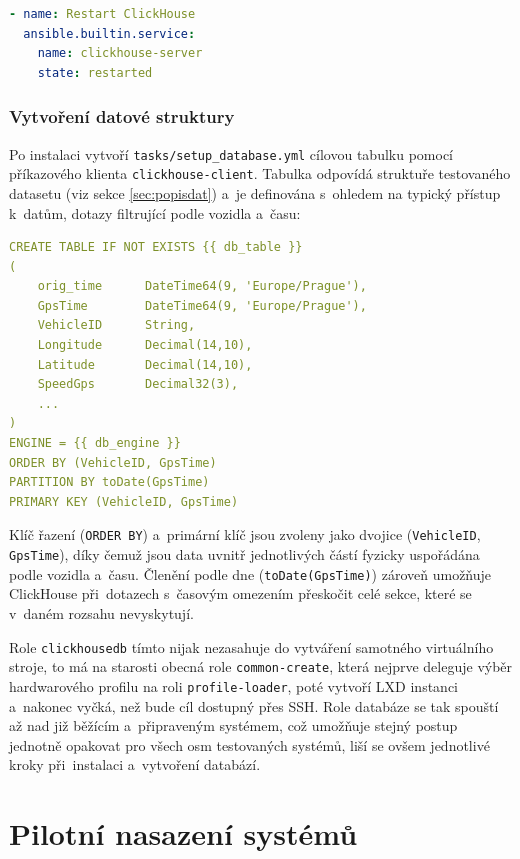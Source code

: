 \begin{lstlisting}[language=YAML, caption={roles/clickhousedb/handlers/main.yml}, label={lst:chhandlers}, captionpos=b]
- name: Restart ClickHouse
  ansible.builtin.service:
    name: clickhouse-server
    state: restarted
\end{lstlisting}

\subsubsection{Vytvoření datové struktury}
Po instalaci vytvoří \texttt{tasks/setup\_database.yml} cílovou tabulku pomocí příkazového klienta \texttt{clickhouse-client}. 
Tabulka odpovídá struktuře testovaného datasetu (viz sekce \ref{sec:popisdat}) a~je definována s~ohledem na typický přístup k~datům, dotazy filtrující podle vozidla a~času:

\begin{lstlisting}[language=YAML, caption={Výřez z~roles/clickhousedb/tasks/setup\_database.yml}, label={lst:chschema}, captionpos=b]
CREATE TABLE IF NOT EXISTS {{ db_table }}
(
    orig_time      DateTime64(9, 'Europe/Prague'),
    GpsTime        DateTime64(9, 'Europe/Prague'),
    VehicleID      String,
    Longitude      Decimal(14,10),
    Latitude       Decimal(14,10),
    SpeedGps       Decimal32(3),
    ...
)
ENGINE = {{ db_engine }}
ORDER BY (VehicleID, GpsTime)
PARTITION BY toDate(GpsTime)
PRIMARY KEY (VehicleID, GpsTime)
\end{lstlisting}

Klíč řazení (\texttt{ORDER BY}) a~primární klíč jsou zvoleny jako dvojice (\texttt{VehicleID}, \texttt{GpsTime}), díky čemuž jsou data uvnitř jednotlivých částí fyzicky uspořádána podle vozidla a~času.
Členění podle dne (\texttt{toDate(GpsTime)}) zároveň umožňuje ClickHouse při~dotazech s~časovým omezením přeskočit celé sekce, které se v~daném rozsahu nevyskytují.

Role \texttt{clickhousedb} tímto nijak nezasahuje do vytváření samotného virtuálního stroje, to má na starosti obecná role \texttt{common-create}, která nejprve deleguje výběr hardwarového profilu na roli \texttt{profile-loader}, poté vytvoří LXD instanci a~nakonec vyčká, než bude cíl dostupný přes SSH. 
Role databáze se tak spouští až nad již běžícím a~připraveným systémem, což umožňuje stejný postup jednotně opakovat pro všech osm testovaných systémů, liší se ovšem jednotlivé kroky při~instalaci a~vytvoření databází.

\section{Pilotní nasazení systémů}

